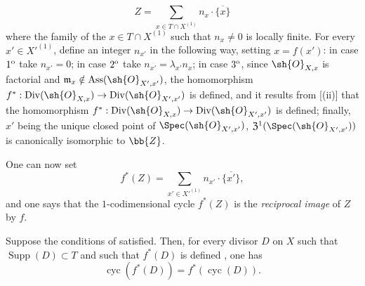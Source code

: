 \begin{env}[21.10.1]
\[  Z=\sum_{x\in T\cap X^{(1)}}n_x\cdot\overline{\{x\}}
  \tag{21.10.1.1}
\]
where the family of the $x\in T\cap X^{(1)}$ such that $n_x\neq 0$ is locally finite.
For every $x'\in X'^{(1)}$, define an integer $n_{x'}$ in the following way, setting $x=f(x')$:
in case $1\textsuperscript{o}$ take $n_{x'}=0$;
in case $2\textsuperscript{o}$ take $n_{x'}=\lambda_{x'}n_x$;
in case $3\textsuperscript{o}$, since $\sh{O}_{X,x}$ is factorial and $\mathfrak{m}_x\notin\operatorname{Ass}(\sh{O}_{X',x'})$, the homomorphism $f^*:\operatorname{Div}(\sh{O}_{X,x})\to\operatorname{Div}(\sh{O}_{X',x'})$ is defined, and it results from [(ii)] that the homomorphism $f^*:\operatorname{Div}(\sh{O}_{X,x})\to\operatorname{Div}(\sh{O}_{X',x'})$ is defined;
finally, $x'$ being the unique closed point of $\Spec(\sh{O}_{X',x'})$, $\mathfrak{Z}^1(\Spec(\sh{O}_{X',x'}))$ is canonically isomorphic to $\bb{Z}$.
\end{env}

One can now set
\[
\label{IV.21.10.3}
  f^*(Z)=\sum_{x'\in X'^{(1)}}n_{x'}\cdot\overline{\{x'\}},
  \tag{21.10.3}
\]
and one says that the $1$-codimensional cycle $f^*(Z)$ is the \emph{reciprocal image} of $Z$ by $f$.

\begin{proposition}[21.10.4]
\label{IV.21.10.4}
Suppose the conditions of  satisfied.
Then, for every divisor $D$ on $X$ such that $\operatorname{Supp}(D)\subset T$ and such that $f^*(D)$ is defined , one has
\[
\label{IV.21.10.4.1}
  \operatorname{cyc}(f^*(D))=f^*(\operatorname{cyc}(D)).
  \tag{21.10.4.1}
\]
\end{proposition}

